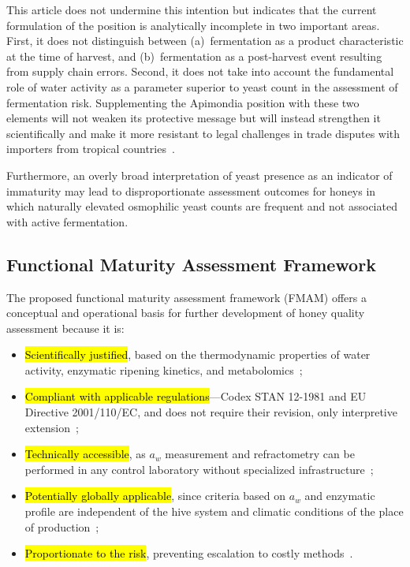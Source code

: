 \documentclass[foods,review,accept,pdftex,moreauthors]{Definitions/mdpi}
\begin{document}
{This article does not undermine this intention but indicates that
the current formulation of the position is analytically incomplete
in two important areas. First, it does not distinguish between
(a)~fermentation as a product characteristic at the time of harvest,
and (b)~fermentation as a post-harvest event resulting from supply
chain errors. Second, it does not take into account the fundamental
role of water activity as a parameter superior to yeast count in the
assessment of fermentation risk. Supplementing the Apimondia position
with these two elements will not weaken its protective message but
will instead strengthen it scientifically and make it more resistant
to legal challenges in trade disputes with importers from tropical
countries~\cite{ruegg1981,tadele2025,analytica2020}.

{Furthermore, an overly broad interpretation of yeast presence as an indicator of immaturity may lead to disproportionate assessment outcomes for honeys in which naturally elevated osmophilic yeast counts are frequent and not associated with active fermentation.}


\subsection{Functional Maturity Assessment Framework}


The proposed functional maturity assessment framework (FMAM) offers a conceptual and operational basis for further development of honey quality assessment because it is:

\begin{itemize}
    \item {\hl{Scientifically justified}}, based on the
          thermodynamic properties of water activity, enzymatic
          ripening kinetics, and
          metabolomics~\cite{ruegg1981,zhang2021,guo2020};
    \item {\hl{Compliant with applicable regulations}}---Codex STAN 12-1981 and EU Directive 2001/110/EC,
          and does not require their revision, only interpretive
          extension~\cite{codex_stan12,eudir2001110};
    \item {\hl{Technically accessible}}, as $a_w$ measurement
          and refractometry can be performed in any control
          laboratory without specialized
          infrastructure~\cite{waaw2006,zamora2006};
    \item {\hl{Potentially globally applicable}}, since criteria based
          on $a_w$ and enzymatic profile are independent of the
          hive system and climatic conditions of the place of
          \mbox{production~\cite{tadele2025,stinglessyeastbrazil2021};}
    \item {\hl{Proportionate to the risk}}, preventing
          escalation to costly
          methods~\cite{schoder2026,nmrhoney2023}.
\end{itemize}


}
\end{document}
